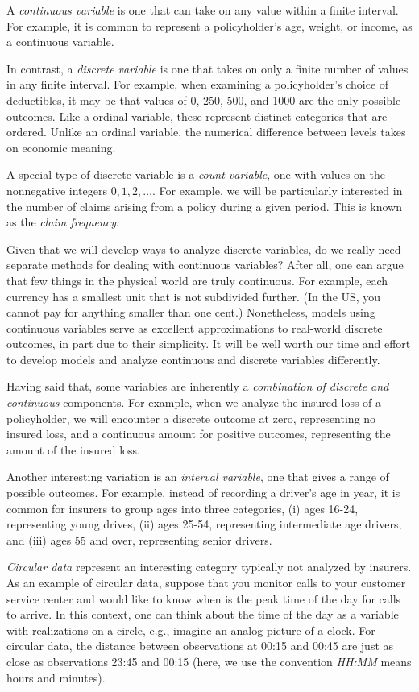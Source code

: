 \documentclass[]{book}
\theoremstyle{definition}
\theoremstyle{definition}
\theoremstyle{definition}
\theoremstyle{remark}
\begin{document}
A \emph{continuous variable} is one that can take on any value within a
finite interval. For example, it is common to represent a policyholder's
age, weight, or income, as a continuous variable.

In contrast, a \emph{discrete variable} is one that takes on only a
finite number of values in any finite interval. For example, when
examining a policyholder's choice of deductibles, it may be that values
of 0, 250, 500, and 1000 are the only possible outcomes. Like a ordinal
variable, these represent distinct categories that are ordered. Unlike
an ordinal variable, the numerical difference between levels takes on
economic meaning.

A special type of discrete variable is a \emph{count variable}, one with
values on the nonnegative integers \(0, 1, 2, \ldots.\) For example, we
will be particularly interested in the number of claims arising from a
policy during a given period. This is known as the \emph{claim
frequency}.

Given that we will develop ways to analyze discrete variables, do we
really need separate methods for dealing with continuous variables?
After all, one can argue that few things in the physical world are truly
continuous. For example, each currency has a smallest unit that is not
subdivided further. (In the US, you cannot pay for anything smaller than
one cent.) Nonetheless, models using continuous variables serve as
excellent approximations to real-world discrete outcomes, in part due to
their simplicity. It will be well worth our time and effort to develop
models and analyze continuous and discrete variables differently.

Having said that, some variables are inherently a \emph{combination of
discrete and continuous} components. For example, when we analyze the
insured loss of a policyholder, we will encounter a discrete outcome at
zero, representing no insured loss, and a continuous amount for positive
outcomes, representing the amount of the insured loss.

Another interesting variation is an \emph{interval variable}, one that
gives a range of possible outcomes. For example, instead of recording a
driver's age in year, it is common for insurers to group ages into three
categories, (i) ages 16-24, representing young drives, (ii) ages 25-54,
representing intermediate age drivers, and (iii) ages 55 and over,
representing senior drivers.

\emph{Circular data} represent an interesting category typically not
analyzed by insurers. As an example of circular data, suppose that you
monitor calls to your customer service center and would like to know
when is the peak time of the day for calls to arrive. In this context,
one can think about the time of the day as a variable with realizations
on a circle, e.g., imagine an analog picture of a clock. For circular
data, the distance between observations at 00:15 and 00:45 are just as
close as observations 23:45 and 00:15 (here, we use the convention
\emph{HH:MM} means hours and minutes).
\end{document}
